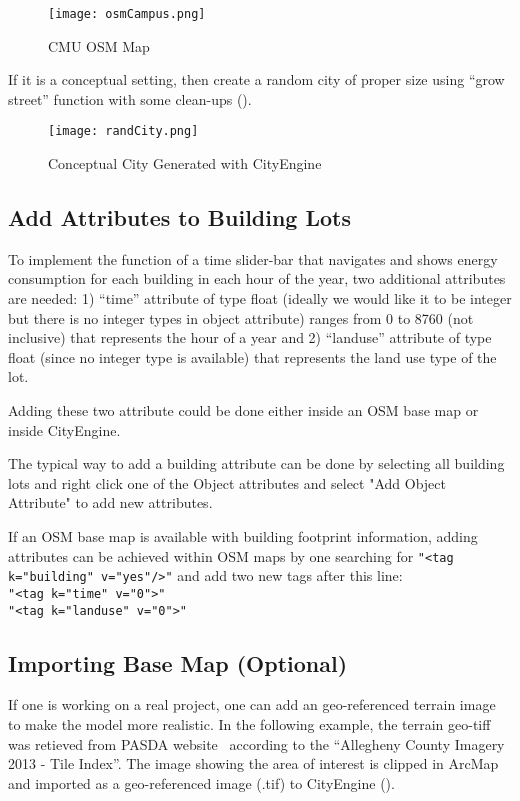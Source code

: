 \begin{figure}[h!]
  \centering
  \texttt{[image: osmCampus.png]}
  \caption[CMU OSM Map]{CMU OSM Map~\cite{OSM2015}}
  \label{fig:osmCampus}
\end{figure}

If it is a conceptual setting, then create a random city of proper
size using ``grow street'' function with some clean-ups
().

\begin{figure}[h!]
  \centering
  \texttt{[image: randCity.png]}
  \caption[Conceptual City Lots]{Conceptual City Generated with
    CityEngine}
  \label{fig:randCity}
\end{figure}
\subsection{Add Attributes to Building Lots}
To implement the function of a time slider-bar that navigates and
shows energy consumption for each building in each hour of the year,
two additional attributes are needed: 1) ``time'' attribute of type
float (ideally we would like it to be integer but there is no integer
types in object attribute) ranges from 0 to 8760 (not inclusive) that
represents the hour of a year and 2) ``landuse'' attribute of type
float (since no integer type is available) that represents the land
use type of the lot.

Adding these two attribute could be done either inside an OSM base map
or inside CityEngine.

The typical way to add a building attribute can be done by selecting
all building lots and right click one of the Object attributes and
select "Add Object Attribute" to add new attributes.

If an OSM base map is available with building footprint information,
adding attributes can be achieved within OSM maps by one searching for
\texttt{"<tag k="building" v="yes"/>"} and add two new tags after this
line:\\
\texttt{"<tag k="time" v="0"\/>"}\\
\texttt{"<tag k="landuse" v="0"\/>"}\\

\subsection{Importing Base Map (Optional)}
If one is working on a real project, one can add an geo-referenced
terrain image to make the model more realistic. In the following
example, the terrain geo-tiff was retieved from PASDA
website~\cite{PASDAImagery2013} according to the ``Allegheny County
Imagery 2013 - Tile Index''. The image showing the area of interest is
clipped in ArcMap and imported as a geo-referenced image (.tif) to
CityEngine ().

